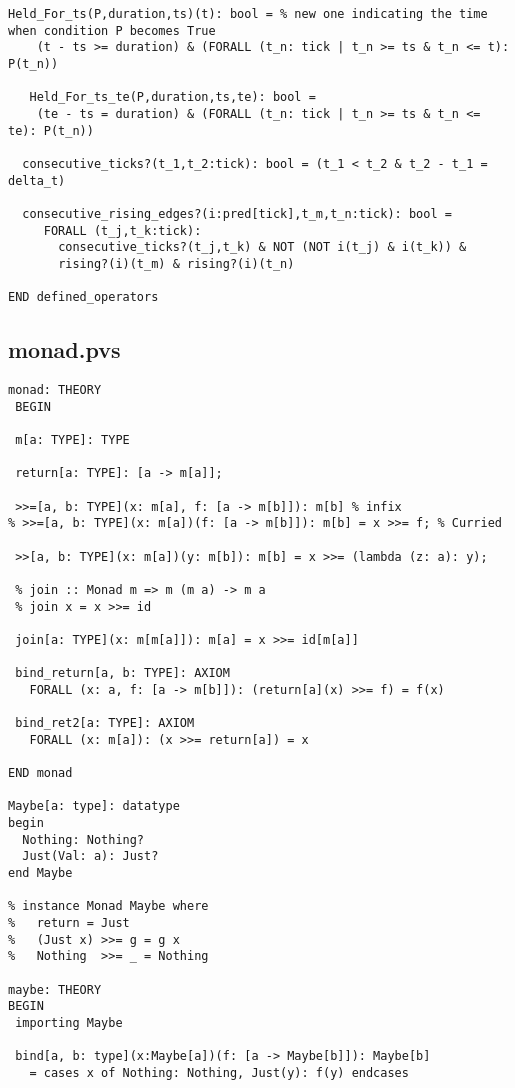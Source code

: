 \begin{singlespace}
\begin{lstlisting}[tabsize=2, language=PVS]
  Held_For_ts(P,duration,ts)(t): bool = % new one indicating the time when condition P becomes True
    (t - ts >= duration) & (FORALL (t_n: tick | t_n >= ts & t_n <= t): P(t_n))

   Held_For_ts_te(P,duration,ts,te): bool = 
    (te - ts = duration) & (FORALL (t_n: tick | t_n >= ts & t_n <= te): P(t_n))

  consecutive_ticks?(t_1,t_2:tick): bool = (t_1 < t_2 & t_2 - t_1 = delta_t)

  consecutive_rising_edges?(i:pred[tick],t_m,t_n:tick): bool = 
     FORALL (t_j,t_k:tick):
       consecutive_ticks?(t_j,t_k) & NOT (NOT i(t_j) & i(t_k)) &
       rising?(i)(t_m) & rising?(i)(t_n)

END defined_operators
\end{lstlisting}

\subsection{monad.pvs} \label{app:schedex:pvslib:monad}

\begin{lstlisting}[tabsize=2, language=PVS]
monad: THEORY
 BEGIN

 m[a: TYPE]: TYPE

 return[a: TYPE]: [a -> m[a]];

 >>=[a, b: TYPE](x: m[a], f: [a -> m[b]]): m[b] % infix
% >>=[a, b: TYPE](x: m[a])(f: [a -> m[b]]): m[b] = x >>= f; % Curried

 >>[a, b: TYPE](x: m[a])(y: m[b]): m[b] = x >>= (lambda (z: a): y);

 % join :: Monad m => m (m a) -> m a
 % join x = x >>= id

 join[a: TYPE](x: m[m[a]]): m[a] = x >>= id[m[a]]

 bind_return[a, b: TYPE]: AXIOM
   FORALL (x: a, f: [a -> m[b]]): (return[a](x) >>= f) = f(x)

 bind_ret2[a: TYPE]: AXIOM
   FORALL (x: m[a]): (x >>= return[a]) = x

END monad

Maybe[a: type]: datatype
begin
  Nothing: Nothing?
  Just(Val: a): Just?
end Maybe
   
% instance Monad Maybe where
%   return = Just
%   (Just x) >>= g = g x
%   Nothing  >>= _ = Nothing

maybe: THEORY
BEGIN
 importing Maybe

 bind[a, b: type](x:Maybe[a])(f: [a -> Maybe[b]]): Maybe[b]
   = cases x of Nothing: Nothing, Just(y): f(y) endcases


\end{lstlisting}
\end{singlespace}

